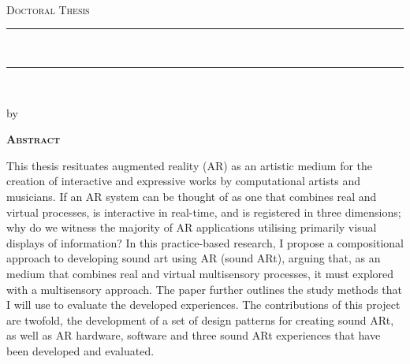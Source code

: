 
\thispagestyle{empty}

\begin{center}

    {\normalsize \href{http://www.sussex.ac.uk/}{\myUni} \\} %
    {\normalsize \myFaculty \\} %
    {\normalsize \myDepartment \\} %
    \bigskip\vspace*{.02\textheight}
    {\Large \textsc{Doctoral Thesis}}\par
    \bigskip
    
    {\rule{\linewidth}{1pt}\\%
    \Large \myTitle \par} %
    \rule{\linewidth}{1pt}\\[0.4cm]
    
    \bigskip
	{\normalsize by \myName \par} %
    \bigskip\vspace*{.06\textheight}
\end{center}

    {\centering\Huge\textsc{\textbf{Abstract}} \par}
    \bigskip



    \noindent This thesis resituates augmented reality (AR) as an artistic medium for the creation of interactive and expressive works by computational artists and musicians. If an AR system can be thought of as one that combines real and virtual processes, is interactive in real-time, and is registered in three dimensions; why do we witness the majority of AR applications utilising primarily visual displays of information? In this practice-based research, I propose a compositional approach to developing sound art using AR (sound ARt), arguing that, as an medium that combines real and virtual multisensory processes, it must explored with a multisensory approach. The paper further outlines the study methods that I will use to evaluate the developed experiences. The contributions of this project are twofold, the development of a set of design patterns for creating sound ARt, as well as AR hardware, software and three sound ARt experiences that have been developed and evaluated.
 
